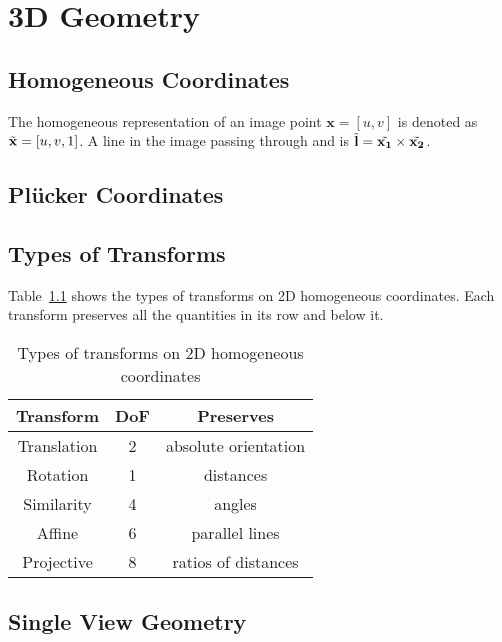 \chapter{3D Geometry} \label{chap:3d_geom}

\section{Homogeneous Coordinates} \label{sec:3d_geom/homo_coords}
The homogeneous representation of an image point $\mathbf{x} = [u, v]$ is denoted as $\tilde{\mathbf{x}} = [u, v, 1]$. A line in the image passing through  and 
is $\tilde{\mathbf{l}} = \tilde{\mathbf{x_1}} \times \tilde{\mathbf{x_2}}$.

\section{Pl\"ucker Coordinates}

\section{Types of Transforms} \label{sec:3d_geom/transforms}

Table~\ref{tab:transform_types} shows the types of transforms on 2D homogeneous coordinates. Each transform preserves all the quantities in its row and below it.

\begin{table}[h!]
\centering
\begin{tabular}{c|c|c}
Transform & DoF & Preserves\\
\hline
Translation & 2 & absolute orientation \\
Rotation & 1 & distances \\
Similarity & 4 & angles \\
Affine & 6 & parallel lines \\
Projective & 8 & ratios of distances\\
\end{tabular}
\caption{Types of transforms on 2D homogeneous coordinates}
\label{tab:transform_types}
\end{table}

\section{Single View Geometry}

